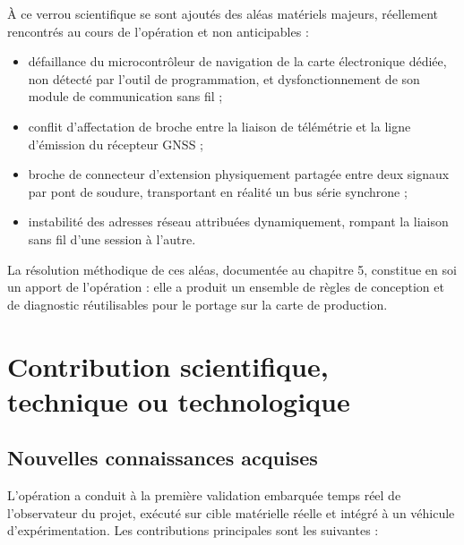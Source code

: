 \documentclass[11pt,a4paper]{article}
\begin{document}
À ce verrou scientifique se sont ajoutés des aléas matériels majeurs, réellement rencontrés au cours de l’opération et non anticipables :

\begin{itemize}
\item défaillance du microcontrôleur de navigation de la carte électronique dédiée, non détecté par l’outil de programmation, et dysfonctionnement de son module de communication sans fil ;
\item conflit d’affectation de broche entre la liaison de télémétrie et la ligne d’émission du récepteur GNSS ;
\item broche de connecteur d’extension physiquement partagée entre deux signaux par pont de soudure, transportant en réalité un bus série synchrone ;
\item instabilité des adresses réseau attribuées dynamiquement, rompant la liaison sans fil d’une session à l’autre.
\end{itemize}

La résolution méthodique de ces aléas, documentée au chapitre 5, constitue en soi un apport de l’opération : elle a produit un ensemble de règles de conception et de diagnostic réutilisables pour le portage sur la carte de production.

\section{Contribution scientifique, technique ou technologique}

\subsection{Nouvelles connaissances acquises}

L’opération a conduit à la première validation embarquée temps réel de l’observateur du projet, exécuté sur cible matérielle réelle et intégré à un véhicule d’expérimentation. Les contributions principales sont les suivantes :
\end{document}
